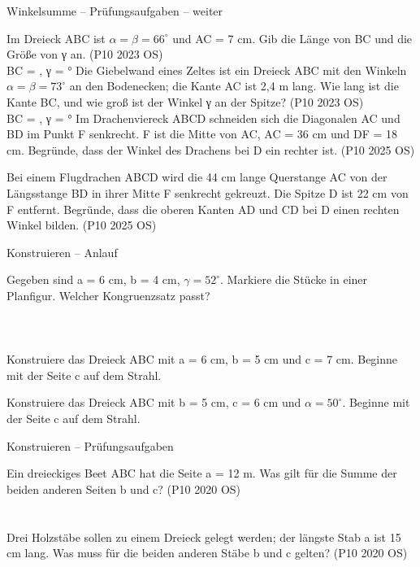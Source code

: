 \begin{aufgabe}{Winkelsumme – Prüfungsaufgaben – weiter}
\begin{teile}
\teil Im Dreieck ABC ist $\alpha = \beta = 66^\circ$ und AC = 7 cm. Gib die Länge von BC und die Größe von γ an. \hfill (P10 2023 OS) \\ BC = \leerfeld[cm] , γ = \leerfeld °
\teil Die Giebelwand eines Zeltes ist ein Dreieck ABC mit den Winkeln $\alpha = \beta = 73^\circ$ an den Bodenecken; die Kante AC ist 2,4 m lang. Wie lang ist die Kante BC, und wie groß ist der Winkel γ an der Spitze? \hfill (P10 2023 OS) \\ BC = \leerfeld[m] , γ = \leerfeld °
\steil Im Drachenviereck ABCD schneiden sich die Diagonalen AC und BD im Punkt F senkrecht. F ist die Mitte von AC, AC = 36 cm und DF = 18 cm. Begründe, dass der Winkel des Drachens bei D ein rechter ist. \hfill (P10 2025 OS)

\steil Bei einem Flugdrachen ABCD wird die 44 cm lange Querstange AC von der Längsstange BD in ihrer Mitte F senkrecht gekreuzt. Die Spitze D ist 22 cm von F entfernt. Begründe, dass die oberen Kanten AD und CD bei D einen rechten Winkel bilden. \hfill (P10 2025 OS)
\end{teile}
\end{aufgabe}

\begin{aufgabe}{Konstruieren – Anlauf}
\begin{teile}
\teil Gegeben sind a = 6 cm, b = 4 cm, $\gamma = 52^\circ$. Markiere die Stücke in einer Planfigur. Welcher Kongruenzsatz passt? \\  \\  \\  \\ 
\teil Konstruiere das Dreieck ABC mit a = 6 cm, b = 5 cm und c = 7 cm. Beginne mit der Seite c auf dem Strahl.

\winkelstrahl[9][A]
\teil Konstruiere das Dreieck ABC mit b = 5 cm, c = 6 cm und $\alpha = 50^\circ$. Beginne mit der Seite c auf dem Strahl.

\winkelstrahl[9][A]
\end{teile}
\end{aufgabe}

\begin{aufgabe}{Konstruieren – Prüfungsaufgaben}
\begin{teile}
\teil Ein dreieckiges Beet ABC hat die Seite a = 12 m. Was gilt für die Summe der beiden anderen Seiten b und c? \hfill (P10 2020 OS) \\  \\  \\ 
\teil Drei Holzstäbe sollen zu einem Dreieck gelegt werden; der längste Stab a ist 15 cm lang. Was muss für die beiden anderen Stäbe b und c gelten? \hfill (P10 2020 OS) \\  \\  \\ 
\end{teile}
\end{aufgabe}

